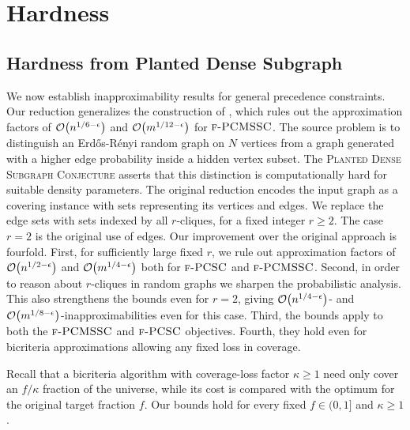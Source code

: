 \section{Hardness} \label{sec:hardness}

\subsection{Hardness from Planted Dense Subgraph}
We now establish inapproximability results for general precedence constraints. Our reduction generalizes the construction of \cite{PCMSSC}, which rules out the approximation factors of $\mathcal{O}\mathopen{}\left( n^{1/6-\epsilon} \right)$ and $\mathcal{O}\mathopen{}\left( m^{1/12-\epsilon} \right)$ for $\textup{\textsc{f-PCMSSC}}$.
The source problem is to distinguish an Erd\H{o}s-R\'enyi random graph on $N$ vertices from a graph generated with a higher edge probability inside a hidden vertex subset. The \textup{\textsc{Planted Dense Subgraph Conjecture}} asserts that this distinction is computationally hard for suitable density parameters. The original reduction encodes the input graph as a covering instance with sets representing its vertices and edges. We replace the edge sets with sets indexed by all $r$-cliques, for a fixed integer $r\geq2$. The case $r=2$ is the original use of edges.
Our improvement over the original approach is fourfold. First, for sufficiently large fixed $r$, we rule out approximation factors of $\mathcal{O}\mathopen{}\left( n^{1/2-\epsilon} \right)$ and $\mathcal{O}\mathopen{}\left( m^{1/4-\epsilon} \right)$ both for $\textup{\textsc{f-PCSC}}$ and $\textup{\textsc{f-PCMSSC}}$. Second, in order to reason about $r$-cliques in random graphs we sharpen the probabilistic analysis. This also strengthens the bounds even for $r=2$, giving $\mathcal{O}\mathopen{}\left( n^{1/4-\epsilon} \right)$- and $\mathcal{O}\mathopen{}\left( m^{1/8-\epsilon} \right)$-inapproximabilities even for this case. Third, the bounds apply to both the $\textup{\textsc{f-PCMSSC}}$ and $\textup{\textsc{f-PCSC}}$ objectives. Fourth, they hold even for bicriteria approximations allowing any fixed loss in coverage.

Recall that a bicriteria algorithm with coverage-loss factor $\kappa\geq1$ need only cover an $f/\kappa$ fraction of the universe, while its cost is compared with the optimum for the original target fraction $f$. Our bounds hold for every fixed $f\in(0,1]$ and $\kappa\geq1$.

